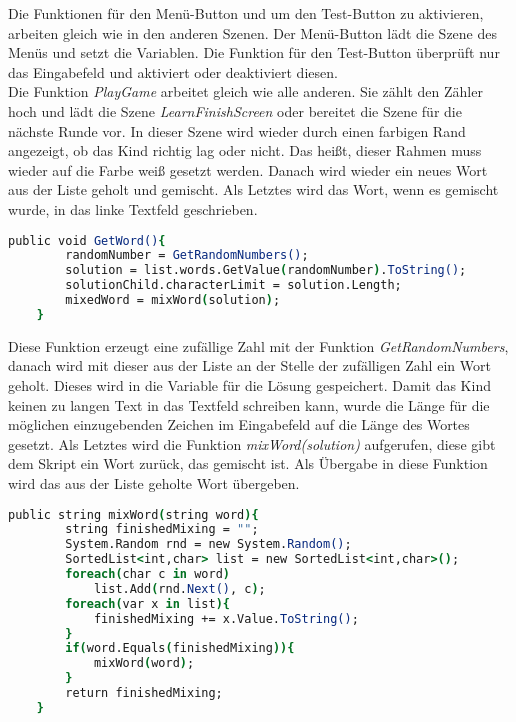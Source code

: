 Die Funktionen für den Menü-Button und um den Test-Button zu aktivieren, arbeiten gleich wie in den anderen Szenen. Der Menü-Button lädt die Szene des Menüs und setzt die Variablen. Die Funktion für den Test-Button überprüft nur das Eingabefeld und aktiviert oder deaktiviert diesen.\\
Die Funktion \textit{PlayGame} arbeitet gleich wie alle anderen. Sie zählt den Zähler hoch und lädt die Szene \textit{LearnFinishScreen} oder bereitet die Szene für die nächste Runde vor. In dieser Szene wird wieder durch einen farbigen Rand angezeigt, ob das Kind richtig lag oder nicht. Das heißt, dieser Rahmen muss wieder auf die Farbe weiß gesetzt werden. Danach wird wieder ein neues Wort aus der Liste geholt und gemischt. Als Letztes wird das Wort, wenn es gemischt wurde, in das linke Textfeld geschrieben.\\
\begin{lstlisting}[language=csh, caption={WordMix.cs GetWord-Funktion}]
	public void GetWord(){
		randomNumber = GetRandomNumbers();
		solution = list.words.GetValue(randomNumber).ToString();
		solutionChild.characterLimit = solution.Length;
		mixedWord = mixWord(solution);
	}
\end{lstlisting}
Diese Funktion erzeugt eine zufällige Zahl mit der Funktion \textit{GetRandomNumbers}, danach wird mit dieser aus der Liste an der Stelle der zufälligen Zahl ein Wort geholt. Dieses wird in die Variable für die Lösung gespeichert. Damit das Kind keinen zu langen Text in das Textfeld schreiben kann, wurde die Länge für die möglichen einzugebenden Zeichen im Eingabefeld auf die Länge des Wortes gesetzt. Als Letztes wird die Funktion \textit{mixWord(solution)} aufgerufen, diese gibt dem Skript ein Wort zurück, das gemischt ist. Als Übergabe in diese Funktion wird das aus der Liste geholte Wort übergeben.\\
\begin{lstlisting}[language=csh, caption={WordMix.cs mixWord-Funktion}]
	public string mixWord(string word){
		string finishedMixing = "";
		System.Random rnd = new System.Random();
		SortedList<int,char> list = new SortedList<int,char>();
		foreach(char c in word)
			list.Add(rnd.Next(), c);
		foreach(var x in list){
			finishedMixing += x.Value.ToString();
		}
		if(word.Equals(finishedMixing)){
			mixWord(word);
		}
		return finishedMixing;
	}
\end{lstlisting}
